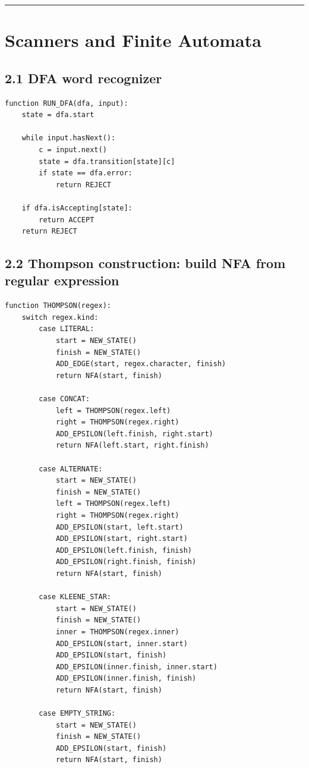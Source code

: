 \documentclass[10pt,letterpaper]{article}
\begin{document}
\medskip\hrule\medskip

\clearpage
\section{Scanners and Finite Automata}

\subsection*{2.1 DFA word recognizer}

\begin{verbatim}
function RUN_DFA(dfa, input):
    state = dfa.start

    while input.hasNext():
        c = input.next()
        state = dfa.transition[state][c]
        if state == dfa.error:
            return REJECT

    if dfa.isAccepting[state]:
        return ACCEPT
    return REJECT
\end{verbatim}

\subsection*{2.2 Thompson construction: build NFA from regular expression}

\begin{verbatim}
function THOMPSON(regex):
    switch regex.kind:
        case LITERAL:
            start = NEW_STATE()
            finish = NEW_STATE()
            ADD_EDGE(start, regex.character, finish)
            return NFA(start, finish)

        case CONCAT:
            left = THOMPSON(regex.left)
            right = THOMPSON(regex.right)
            ADD_EPSILON(left.finish, right.start)
            return NFA(left.start, right.finish)

        case ALTERNATE:
            start = NEW_STATE()
            finish = NEW_STATE()
            left = THOMPSON(regex.left)
            right = THOMPSON(regex.right)
            ADD_EPSILON(start, left.start)
            ADD_EPSILON(start, right.start)
            ADD_EPSILON(left.finish, finish)
            ADD_EPSILON(right.finish, finish)
            return NFA(start, finish)

        case KLEENE_STAR:
            start = NEW_STATE()
            finish = NEW_STATE()
            inner = THOMPSON(regex.inner)
            ADD_EPSILON(start, inner.start)
            ADD_EPSILON(start, finish)
            ADD_EPSILON(inner.finish, inner.start)
            ADD_EPSILON(inner.finish, finish)
            return NFA(start, finish)

        case EMPTY_STRING:
            start = NEW_STATE()
            finish = NEW_STATE()
            ADD_EPSILON(start, finish)
            return NFA(start, finish)
\end{verbatim}
\end{document}
